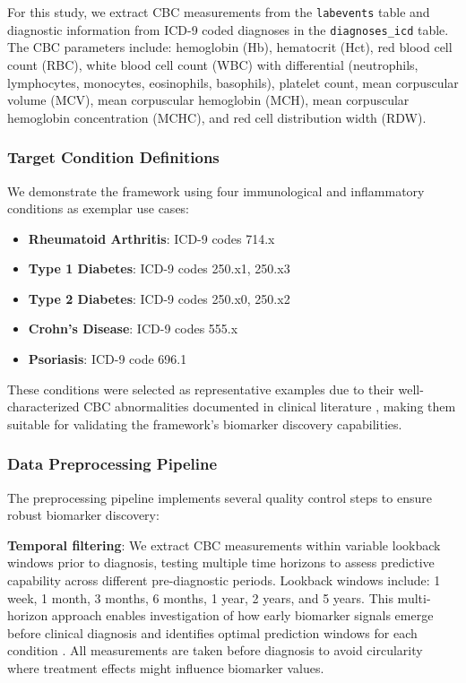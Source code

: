 \documentclass[12pt,a4paper]{article}
\begin{document}
For this study, we extract CBC measurements from the \texttt{labevents} table and diagnostic information from ICD-9 coded diagnoses in the \texttt{diagnoses\_icd} table. The CBC parameters include: hemoglobin (Hb), hematocrit (Hct), red blood cell count (RBC), white blood cell count (WBC) with differential (neutrophils, lymphocytes, monocytes, eosinophils, basophils), platelet count, mean corpuscular volume (MCV), mean corpuscular hemoglobin (MCH), mean corpuscular hemoglobin concentration (MCHC), and red cell distribution width (RDW).

\subsubsection{Target Condition Definitions}

We demonstrate the framework using four immunological and inflammatory conditions as exemplar use cases:

\begin{itemize}
\item \textbf{Rheumatoid Arthritis}: ICD-9 codes 714.x
\item \textbf{Type 1 Diabetes}: ICD-9 codes 250.x1, 250.x3
\item \textbf{Type 2 Diabetes}: ICD-9 codes 250.x0, 250.x2
\item \textbf{Crohn's Disease}: ICD-9 codes 555.x
\item \textbf{Psoriasis}: ICD-9 code 696.1
\end{itemize}

These conditions were selected as representative examples due to their well-characterized CBC abnormalities documented in clinical literature \cite{ref10,ref14,ref15,ref16}, making them suitable for validating the framework's biomarker discovery capabilities.

\subsubsection{Data Preprocessing Pipeline}

The preprocessing pipeline implements several quality control steps to ensure robust biomarker discovery:

\textbf{Temporal filtering}: We extract CBC measurements within variable lookback windows prior to diagnosis, testing multiple time horizons to assess predictive capability across different pre-diagnostic periods. Lookback windows include: 1 week, 1 month, 3 months, 6 months, 1 year, 2 years, and 5 years. This multi-horizon approach enables investigation of how early biomarker signals emerge before clinical diagnosis and identifies optimal prediction windows for each condition \cite{ref6,ref11}. All measurements are taken before diagnosis to avoid circularity where treatment effects might influence biomarker values.
\end{document}
